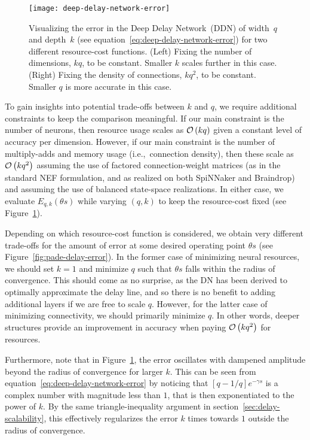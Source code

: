 \begin{figure}
  \centering
  \texttt{[image: deep-delay-network-error]}
  \caption{\label{fig:deep-delay-network-error}
    Visualizing the error in the Deep Delay Network~(DDN) of width~$q$ and depth~$k$ (see equation~\ref{eq:deep-delay-network-error}) for two different resource-cost functions.
    (Left) Fixing the number of dimensions, $kq$, to be constant.
    Smaller $k$ scales further in this case.
    (Right) Fixing the density of connections, $kq^2$, to be constant.
    Smaller $q$ is more accurate in this case.
  }
\end{figure}

To gain insights into potential trade-offs between $k$ and $q$, we require additional constraints to keep the comparison meaningful.
If our main constraint is the number of neurons, then resource usage scales as $\mathcal{O}\left({k q}\right)$ given a constant level of accuracy per dimension.
However, if our main constraint is the number of multiply-adds and memory usage (i.e.,~connection density), then these scale as $\mathcal{O}\left({k q^2}\right)$ assuming the use of factored connection-weight matrices (as in the standard NEF formulation, and as realized on both SpiNNaker and Braindrop) and assuming the use of balanced state-space realizations.
In either case, we evaluate $E_{q,k}(\theta s)$ while varying $(q, k)$ to keep the resource-cost fixed (see Figure~\ref{fig:deep-delay-network-error}).

Depending on which resource-cost function is considered, we obtain very different trade-offs for the amount of error at some desired operating point $\theta s$ (see Figure~\ref{fig:pade-delay-error}).
In the former case of minimizing neural resources, we should set $k = 1$ and minimize $q$ such that $\theta s$ falls within the radius of convergence.
This should come as no surprise, as the DN has been derived to optimally approximate the delay line, and so there is no benefit to adding additional layers if we are free to scale $q$.
However, for the latter case of minimizing connectivity, we should primarily minimize $q$.
In other words, deeper structures provide an improvement in accuracy when paying $\mathcal{O}\left({kq^2}\right)$ for resources.

Furthermore, note that in Figure~\ref{fig:deep-delay-network-error}, the error oscillates with dampened amplitude beyond the radius of convergence for larger $k$.
This can be seen from equation~\ref{eq:deep-delay-network-error} by noticing that $[q-1/q]e^{-\gamma s}$ is a complex number with magnitude less than $1$, that is then exponentiated to the power of $k$.
By the same triangle-inequality argument in section~\ref{sec:delay-scalability}, this effectively regularizes the error $k$ times towards $1$ outside the radius of convergence.

